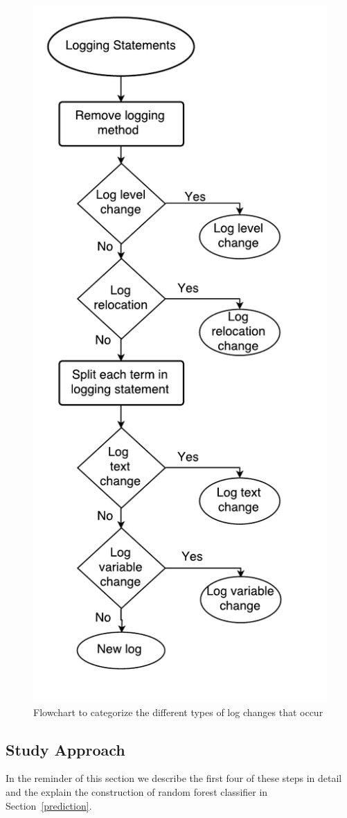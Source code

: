 \begin{figure}[th]
	\centering
	\includegraphics[width=0.7\linewidth]{Flowchart2}
	\caption{Flowchart to categorize the different types of log changes that occur}
	\label{fig:Flowchart2}
\end{figure}

\subsection{Study Approach}

 In the reminder of this section we describe the first four of these steps in detail and the explain the construction of random forest classifier in Section~\ref{prediction}.

